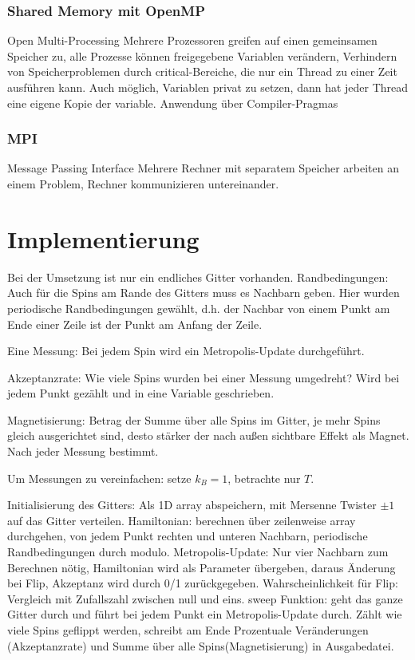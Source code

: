 \documentclass{scrreprt}
\begin{document}
	\subsection{Shared Memory mit OpenMP}
	Open Multi-Processing\cite{specificationsopenmp}
	Mehrere Prozessoren greifen auf einen gemeinsamen Speicher zu, alle Prozesse können freigegebene Variablen verändern, Verhindern von Speicherproblemen durch critical-Bereiche, die nur ein Thread zu einer Zeit ausführen kann. Auch möglich, Variablen privat zu setzen, dann hat jeder Thread eine eigene Kopie der variable. Anwendung über Compiler-Pragmas\cite{tutorialopenmp}
	\subsection{MPI}
	Message Passing Interface
	Mehrere Rechner mit separatem Speicher arbeiten an einem Problem, Rechner kommunizieren untereinander.
	
	
		
	\chapter{Implementierung}
	Bei der Umsetzung ist nur ein endliches Gitter vorhanden.
	Randbedingungen: Auch für die Spins am Rande des Gitters muss es Nachbarn geben. Hier wurden periodische Randbedingungen gewählt, d.h. der Nachbar von einem Punkt am Ende einer Zeile ist der Punkt am Anfang der Zeile.
	
	Eine Messung: Bei jedem Spin wird ein Metropolis-Update durchgeführt.
	
	Akzeptanzrate: Wie viele Spins wurden bei einer Messung umgedreht? Wird bei jedem Punkt gezählt und in eine Variable geschrieben.
	
	Magnetisierung: Betrag der Summe über alle Spins im Gitter, je mehr Spins gleich ausgerichtet sind, desto stärker der nach außen sichtbare Effekt als Magnet. Nach jeder Messung bestimmt.
	
	Um Messungen zu vereinfachen: setze $k_B=1$, betrachte nur $T$.
		
	Initialisierung des Gitters: Als 1D array abspeichern, mit Mersenne Twister $\pm1$ auf das Gitter verteilen.
	Hamiltonian: berechnen über zeilenweise array durchgehen, von jedem Punkt rechten und unteren Nachbarn, periodische Randbedingungen durch modulo.
	Metropolis-Update: Nur vier Nachbarn zum Berechnen nötig, Hamiltonian wird als Parameter übergeben, daraus Änderung bei Flip, Akzeptanz wird durch 0/1 zurückgegeben. Wahrscheinlichkeit für Flip: Vergleich mit Zufallszahl zwischen null und eins.
	sweep Funktion: geht das ganze Gitter durch und führt bei jedem Punkt ein Metropolis-Update durch. Zählt wie viele Spins geflippt werden, schreibt am Ende Prozentuale Veränderungen (Akzeptanzrate) und Summe über alle Spins(Magnetisierung) in Ausgabedatei.
	
\end{document}
